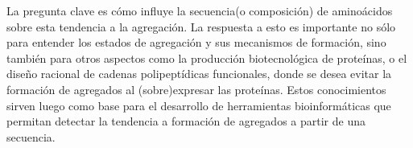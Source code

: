 % 




























La pregunta clave es cómo influye la secuencia(o composición) de aminoácidos sobre esta tendencia a la agregación.
La respuesta a esto es importante no sólo para entender los estados de agregación y sus mecanismos de formación, sino también para otros aspectos como 
la producción biotecnológica de proteínas, o el diseño racional de cadenas polipeptídicas funcionales, donde se desea evitar la formación de agregados al (sobre)expresar las proteínas.
Estos conocimientos sirven luego como base para el desarrollo de herramientas bioinformáticas que permitan detectar la tendencia a formación de agregados a partir de una secuencia.

